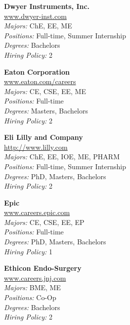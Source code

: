 \documentclass{article}
\begin{document}
\begin{center}
\begin{multicols}{3}
\begin{minipage}{.9\columnwidth}{\Large\bf Dwyer Instruments, Inc. }\\
	\url{www.dwyer-inst.com}\\
	\emph{Majors:} ChE, EE, ME\\
	\emph{Positions:} Full-time, Summer Internship\\
	\emph{Degrees:} Bachelors\\
	\emph{Hiring Policy:} 2\\
\end{minipage}
 
\begin{minipage}{.9\columnwidth}{\Large\bf Eaton Corporation }\\
	\url{www.eaton.com/careers}\\
	\emph{Majors:} CE, CSE, EE, ME\\
	\emph{Positions:} Full-time\\
	\emph{Degrees:} Masters, Bachelors\\
	\emph{Hiring Policy:} 2\\
\end{minipage}
 
\begin{minipage}{.9\columnwidth}{\Large\bf Eli Lilly and Company }\\
	\url{http://www.lilly.com}\\
	\emph{Majors:} ChE, EE, IOE, ME, PHARM\\
	\emph{Positions:} Full-time, Summer Internship\\
	\emph{Degrees:} PhD, Masters, Bachelors\\
	\emph{Hiring Policy:} 2\\
\end{minipage}
 
\begin{minipage}{.9\columnwidth}{\Large\bf Epic }\\
	\url{www.careers.epic.com}\\
	\emph{Majors:} CE, CSE, EE, EP\\
	\emph{Positions:} Full-time\\
	\emph{Degrees:} PhD, Masters, Bachelors\\
	\emph{Hiring Policy:} 1\\
\end{minipage}
 
\begin{minipage}{.9\columnwidth}{\Large\bf Ethicon Endo-Surgery }\\
	\url{www.careers.jnj.com}\\
	\emph{Majors:} BME, ME\\
	\emph{Positions:} Co-Op\\
	\emph{Degrees:} Bachelors\\
	\emph{Hiring Policy:} 2\\
\end{minipage}
 

\end{multicols}
\end{center}
\end{document}
